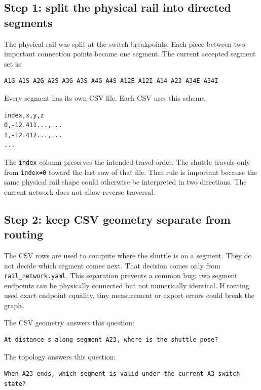 \documentclass[12pt,a4paper]{report}
\begin{document}
\subsection*{Step 1: split the physical rail into directed segments}

The physical rail was split at the switch breakpoints. Each piece between two
important connection points became one segment. The current accepted segment
set is:

\begin{lstlisting}[style=terminalcode]
A1G A1S A2G A2S A3G A3S A4G A4S A12E A12I A14 A23 A34E A34I
\end{lstlisting}

Every segment has its own CSV file. Each CSV uses this schema:

\begin{lstlisting}[style=terminalcode]
index,x,y,z
0,-12.411...,...
1,-12.412...,...
...
\end{lstlisting}

The \texttt{index} column preserves the intended travel order. The shuttle
travels only from \texttt{index=0} toward the last row of that file. That rule
is important because the same physical rail shape could otherwise be interpreted
in two directions. The current network does not allow reverse traversal.

\subsection*{Step 2: keep CSV geometry separate from routing}

The CSV rows are used to compute where the shuttle is on a segment. They do not
decide which segment comes next. That decision comes only from
\texttt{rail\_network.yaml}. This separation prevents a common bug: two segment
endpoints can be physically connected but not numerically identical. If routing
used exact endpoint equality, tiny measurement or export errors could break the
graph.

The CSV geometry answers this question:

\begin{lstlisting}[style=terminalcode]
At distance s along segment A23, where is the shuttle pose?
\end{lstlisting}

The topology answers this question:

\begin{lstlisting}[style=terminalcode]
When A23 ends, which segment is valid under the current A3 switch state?
\end{lstlisting}
\end{document}
